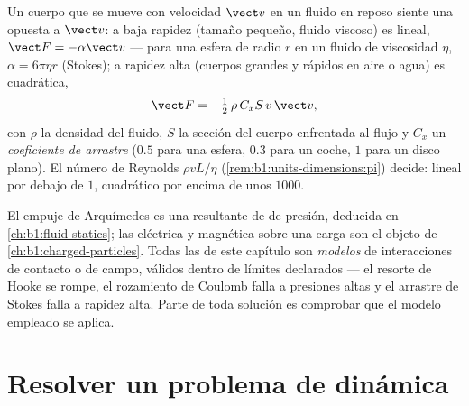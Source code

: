 \begin{proposition}\label{prop:b1:newton-dynamics:drag}
Un cuerpo que se mueve con velocidad $\vect v$ en un fluido en reposo
siente una \emph{} opuesta a $\vect v$: a baja rapidez
(tamaño pequeño, fluido viscoso) es lineal, $\vect F = -\alpha\vect v$
--- para una esfera de radio $r$ en un fluido de viscosidad $\eta$,
$\alpha = 6\pi\eta r$ (Stokes); a rapidez alta (cuerpos grandes y rápidos
en aire o agua) es cuadrática,
\[
\vect F = -\tfrac12\,\rho\,C_xS\,v\,\vect v ,
\]
con $\rho$ la densidad del fluido, $S$ la sección del cuerpo enfrentada al
flujo y $C_x$ un \emph{coeficiente de arrastre}  ($0.5$ para
una esfera, $0.3$ para un coche, $1$ para un disco plano). El número de
Reynolds $\rho vL/\eta$ (\cref{rem:b1:units-dimensions:pi}) decide: lineal
por debajo de $1$, cuadrático por encima de unos $1000$.
\end{proposition}
\admitted

\begin{remark}\label{rem:b1:newton-dynamics:others}
El empuje de Arquímedes es una resultante de  de presión, deducida
en \cref{ch:b1:fluid-statics}; las  eléctrica y magnética sobre una
carga son el objeto de \cref{ch:b1:charged-particles}. Todas las 
de este capítulo son \emph{modelos} de interacciones de contacto o de
campo, válidos dentro de límites declarados --- el resorte de Hooke se
rompe, el rozamiento de Coulomb falla a presiones altas y el arrastre de
Stokes falla a rapidez alta. Parte de toda solución es comprobar que el
modelo empleado se aplica.
\end{remark}

\section{Resolver un problema de dinámica}

